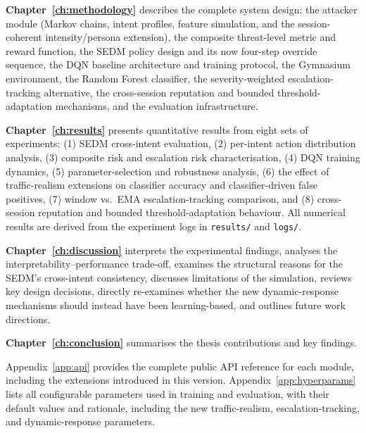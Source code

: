 \noindent\textbf{Chapter~\ref{ch:methodology}} describes the complete system
design: the attacker module (Markov chains, intent profiles, feature
simulation, and the session-coherent intensity/persona extension), the
composite threat-level metric and reward function, the SEDM policy design
and its now four-step override sequence, the DQN baseline architecture
and training protocol, the Gymnasium environment, the Random Forest
classifier, the severity-weighted escalation-tracking alternative, the
cross-session reputation and bounded threshold-adaptation mechanisms, and
the evaluation infrastructure.

\noindent\textbf{Chapter~\ref{ch:results}} presents quantitative results
from eight sets of experiments: (1) SEDM cross-intent evaluation,
(2) per-intent action distribution analysis, (3) composite risk and
escalation risk characterisation, (4) DQN training dynamics,
(5) parameter-selection and robustness analysis, (6) the effect of
traffic-realism extensions on classifier accuracy and classifier-driven
false positives, (7) window vs.\ EMA escalation-tracking comparison, and
(8) cross-session reputation and bounded threshold-adaptation behaviour.
All numerical results are derived from the experiment logs in
\texttt{results/} and \texttt{logs/}.

\noindent\textbf{Chapter~\ref{ch:discussion}} interprets the experimental
findings, analyses the interpretability--performance trade-off, examines the
structural reasons for the SEDM's cross-intent consistency, discusses
limitations of the simulation, reviews key design decisions, directly
re-examines whether the new dynamic-response mechanisms should instead have
been learning-based, and outlines future work directions.

\noindent\textbf{Chapter~\ref{ch:conclusion}} summarises the thesis
contributions and key findings.

\noindent Appendix~\ref{app:api} provides the complete public API reference
for each module, including the extensions introduced in this version.
Appendix~\ref{app:hyperparams} lists all configurable parameters used in
training and evaluation, with their default values and rationale, including
the new traffic-realism, escalation-tracking, and dynamic-response
parameters.
